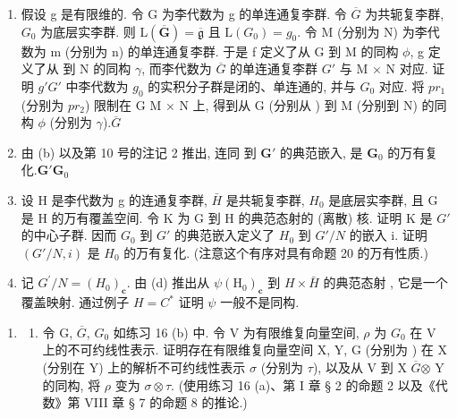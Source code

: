 \begin{enumerate}
\def\labelenumi{(\alph{enumi})}
\setcounter{enumi}{1}
\item
  假设 g 是有限维的. 令 G 为李代数为 g 的单连通复李群. 令 \(\overline{G}\) 为共轭复李群, \(G_{0}\) 为底层实李群. 则 \(\mathrm{L}(\overline{\mathbf{G}})=\overline{\mathfrak{g}}\) 且 \(\mathrm{L}(G_{0})=g_{0}\). 令 M (分别为 N) 为李代数为 m (分别为 n) 的单连通复李群. 于是 f 定义了从 G 到 M 的同构 \(\phi\), g 定义了从  到 N 的同构 \(\gamma\), 而李代数为 \(\overline{G}\) 的单连通复李群 \(G'\) 与 M × N 对应. 证明 \(g'\)\(G'\) 中李代数为 \(g_{0}\) 的实积分子群是闭的、单连通的, 并与 \(G_{0}\) 对应. 将 \(pr_{1}\) (分别为 \(pr_{2}\)) 限制在 G  M × N 上, 得到从 G (分别从 ) 到 M (分别到 N) 的同构 \(\phi\) (分别为 \(\gamma\)).\(\overline{G}\)
\item
  由 (b) 以及第 10 号的注记 2 推出,  连同  到 \(\mathbf{G}'\) 的典范嵌入, 是 \(\mathbf{G}_0\) 的万有复化.\(\mathbf{G}'\)\(\mathbf{G}_0\)
\item
  设 H 是李代数为 g 的连通复李群, \(\bar{H}\) 是共轭复李群, \(H_{0}\) 是底层实李群, 且 G 是 H 的万有覆盖空间. 令 K 为 G 到 H 的典范态射的 (离散) 核. 证明 K 是 \(G'\) 的中心子群. 因而 \(G_{0}\) 到 \(G'\) 的典范嵌入定义了 \(H_{0}\) 到 \(G'/N\) 的嵌入 i. 证明 \((G'/N, i)\) 是 \(H_{0}\) 的万有复化. (注意这个有序对具有命题 20 的万有性质.)
\item
  记 \(G^{\prime}/N = (H_{0})_{\mathbf{c}}\). 由 (d) 推出从 \(\psi\)\((\mathrm{H}_{0})_{\mathbf{c}}\) 到 \(H \times \bar{H}\) 的典范态射 , 它是一个覆盖映射. 通过例子 \(H = C^{*}\) 证明 \(\psi\) 一般不是同构.
\end{enumerate}

\begin{enumerate}
\def\labelenumi{\arabic{enumi}.}
\setcounter{enumi}{16}
\tightlist
\item
  \begin{enumerate}
  \def\labelenumii{(\alph{enumii})}
  \tightlist
  \item
    令 G, \(\overline{G}\), \(G_{0}\) 如练习 16 (b) 中. 令 V 为有限维复向量空间, \(\rho\) 为 \(G_{0}\) 在 V 上的不可约线性表示. 证明存在有限维复向量空间 X, Y, G (分别为 ) 在 X (分别在 Y) 上的解析不可约线性表示 \(\sigma\) (分别为 \(\tau\)), 以及从 V 到 X \(\overline{G}\)\(\otimes\) Y 的同构, 将 \(\rho\) 变为 \(\sigma \otimes \tau\). (使用练习 16 (a)、第 I 章 § 2 的命题 2 以及《代数》第 VIII 章 § 7 的命题 8 的推论.)
  \end{enumerate}
\end{enumerate}

